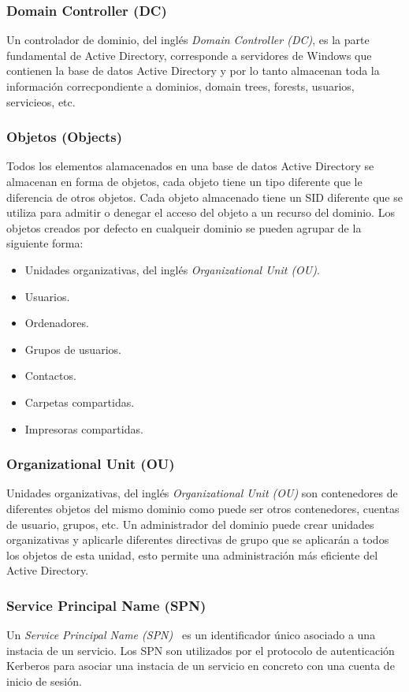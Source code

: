 \subsubsection{Domain Controller (DC)}

Un controlador de dominio, del inglés {\it Domain Controller (DC)}, es la parte fundamental de Active Directory, corresponde a servidores de Windows que contienen la base de datos Active Directory y por lo tanto almacenan toda la información correcpondiente a dominios, domain trees, forests, usuarios, servicieos, etc. 

\subsubsection{Objetos (Objects)}

Todos los elementos alamacenados en una base de datos Active Directory se almacenan en forma de objetos, cada objeto tiene un tipo diferente que le diferencia de otros objetos. Cada objeto almacenado tiene un SID diferente que se utiliza para admitir o denegar el acceso del objeto a un recurso del dominio. Los objetos creados por defecto en cualqueir dominio se pueden agrupar de la siguiente forma: 

\begin{itemize}
\item Unidades organizativas, del inglés {\it Organizational Unit (OU)}. 
\item Usuarios.
\item Ordenadores. 
\item Grupos de usuarios.
\item Contactos.
\item Carpetas compartidas. 
\item Impresoras compartidas.
\end{itemize}

\subsubsection{Organizational Unit (OU)}

Unidades organizativas, del inglés {\it Organizational Unit (OU)} son contenedores de diferentes objetos del mismo dominio como puede ser otros contenedores, cuentas de usuario, grupos, etc. Un administrador del dominio puede crear unidades organizativas y aplicarle diferentes directivas de grupo que se aplicarán a todos los objetos de esta unidad, esto permite una administración más eficiente del Active Directory. 

\subsubsection{Service Principal Name (SPN)}

Un {\it Service Principal Name (SPN)}~\cite{Capitulo4:SPN} es un identificador único asociado a una instacia de un servicio. Los SPN son utilizados por el protocolo de autenticación Kerberos para asociar una instacia de un servicio en concreto con una cuenta de inicio de sesión.  

